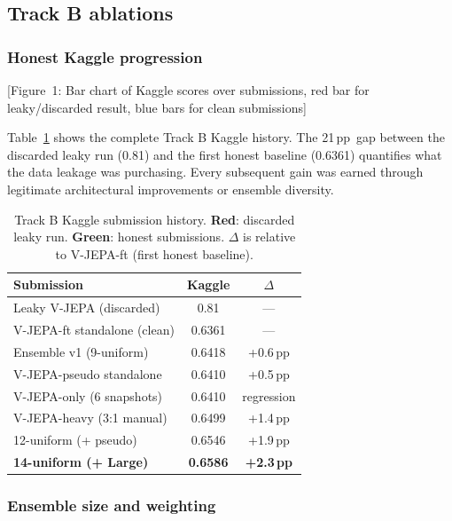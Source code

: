 \documentclass[10pt,twocolumn,letterpaper]{article}
\newcommand{\pp}{\,pp}
\begin{document}
\subsection{Track B ablations}

\subsubsection{Honest Kaggle progression}

[Figure~1: Bar chart of Kaggle scores over submissions, red bar for
leaky/discarded result, blue bars for clean submissions]

Table~\ref{tab:progression} shows the complete Track B Kaggle history.
The 21\pp\ gap between the discarded leaky run (0.81) and the first
honest baseline (0.6361) quantifies what the data leakage was purchasing.
Every subsequent gain was earned through legitimate architectural
improvements or ensemble diversity.

\begin{table}[!t]
\centering
\caption{Track B Kaggle submission history.
  \textcolor{leakyred}{\textbf{Red}}: discarded leaky run.
  \textcolor{cleangreen}{\textbf{Green}}: honest submissions.
  $\Delta$ is relative to V-JEPA-ft (first honest baseline).}
\label{tab:progression}
\setlength{\tabcolsep}{4pt}
\small
\begin{tabular}{lcc}
\toprule
\textbf{Submission} & \textbf{Kaggle} & \textbf{$\Delta$}\\
\midrule
\textcolor{leakyred}{Leaky V-JEPA (discarded)} & \textcolor{leakyred}{0.81} & \textcolor{leakyred}{—}\\
\midrule
V-JEPA-ft standalone (clean) & 0.6361 & —\\
Ensemble v1 (9-uniform) & 0.6418 & +0.6\pp \\
V-JEPA-pseudo standalone & 0.6410 & +0.5\pp \\
V-JEPA-only (6 snapshots) & 0.6410 & regression\\
V-JEPA-heavy (3:1 manual) & 0.6499 & +1.4\pp \\
12-uniform (+ pseudo) & 0.6546 & +1.9\pp \\
\textbf{14-uniform (+ Large)} & \textbf{0.6586} & \textbf{+2.3\pp}\\
\bottomrule
\end{tabular}
\end{table}

\subsubsection{Ensemble size and weighting}
\end{document}
